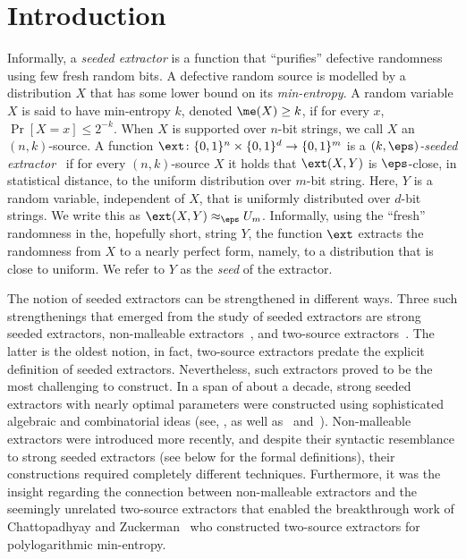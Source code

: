 \documentclass{toc}
\begin{document}
%
%
%


\section{Introduction}


Informally, a \emph{seeded extractor} is a function that ``purifies'' defective randomness using few fresh  random bits. A defective random source is modelled by a distribution $X$ that has some
%
 lower bound on its \emph{min-entropy}. A random variable $X$ is said to have min-entropy $k$, denoted $\me(X) \ge k$, if for every $x$, $\Pr[X = x] \le 2^{-k}$.  When $X$ is supported over $n$-bit strings, we call $X$ an $(n,k)$-source. A function $\ext \colon \{0,1\}^n \times \{0,1\}^d \to \{0,1\}^m$ is a \emph{$(k,\eps)$-seeded extractor}~\cite{NZ96} if for every $(n,k)$-source $X$ it holds that $\ext(X,Y)$ is $\eps$-close, in statistical distance, to the uniform distribution over $m$-bit string. Here, $Y$ is a random variable, independent of $X$, that is uniformly distributed over $d$-bit strings. We write this as $\ext(X,Y) \approx_\eps U_m$. Informally, using the ``fresh'' randomness in the,
%
hopefully short, %
string $Y$, the function $\ext$ extracts the randomness from $X$ to a nearly perfect form, namely, to a distribution that is close to uniform. We refer to $Y$ as the \emph{seed} of the extractor.

The notion of seeded extractors can be strengthened in different ways. Three such strengthenings that emerged from the study of seeded extractors are strong seeded extractors, non-malleable extractors~\cite{DW09}, and two-source extractors~\cite{CG88}. The latter is the oldest notion, in fact, two-source extractors predate the explicit definition of seeded extractors. Nevertheless, such extractors proved to be the most challenging to construct. In a span of about a decade, strong seeded extractors with nearly optimal parameters were constructed using sophisticated algebraic and combinatorial ideas (see, \eg, \cite{Trevisan01,LRVW03,GUV09,DKSS13,TSU12} as well as~\cite{Shaltiel11} and~\cite[Chapter 6]{Vadhan12}). Non-malleable extractors were introduced more recently, and despite their syntactic resemblance to strong seeded extractors (see  below for the formal definitions), their constructions required completely different techniques. Furthermore, it was the insight regarding the connection between non-malleable extractors and the seemingly unrelated two-source extractors that enabled the breakthrough
work of Chattopadhyay and Zuckerman~\cite{CZ19} who constructed two-source extractors for
%
polylogarithmic  %
min-entropy. 
%
%
\end{document}
